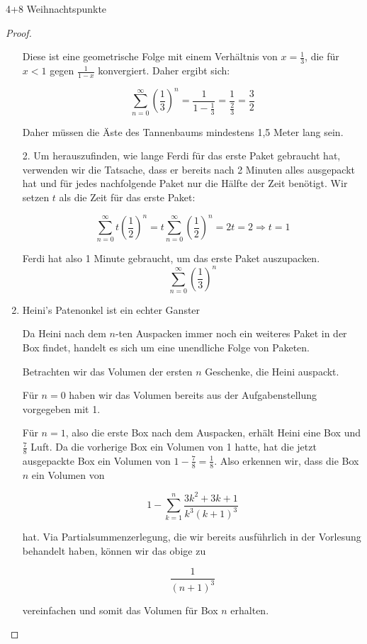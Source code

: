 \documentclass{../problemset}
\begin{document}
\begin{problem}[Weihnachtsaufgaben*]{4+8 Weihnachtspunkte}
\begin{proof}
\begin{enumerate}
		      Diese ist eine geometrische Folge mit einem Verhältnis von \(x = \frac{1}{3}\),
		      die für \(x < 1\) gegen \(\frac{1}{1 - x}\) konvergiert. Daher ergibt sich:

		      \[
			      \sum_{n=0}^{\infty} {\left(\frac{1}{3}\right)}^n = \frac{1}{1 - \frac{1}{3}} = \frac{1}{\frac{2}{3}} = \frac{3}{2}
		      \]

		      Daher müssen die Äste des Tannenbaums mindestens 1,5 Meter lang sein.

		      2. Um herauszufinden, wie lange Ferdi für das erste Paket gebraucht hat, verwenden wir die Tatsache, dass er bereits nach 2 Minuten alles ausgepackt hat und für jedes nachfolgende Paket nur die Hälfte der Zeit benötigt.
		      Wir setzen $t$ als die Zeit für das erste Paket:

		      \[
			      \sum_{n=0}^{\infty} t {\left(\frac{1}{2}\right)}^n = t \sum_{n=0}^{\infty} {\left(\frac{1}{2}\right)}^n = 2t = 2 \Rightarrow t = 1
		      \]

		      Ferdi hat also 1 Minute gebraucht, um das erste Paket auszupacken.
		      \[
			      \sum_{n=0}^{\infty} {\left(\frac{1}{3}\right)}^n
		      \]

		\item Heini's Patenonkel ist ein echter Ganster

		      Da Heini nach dem $n$-ten Auspacken immer noch ein weiteres Paket in der Box
		      findet, handelt es sich um eine unendliche Folge von Paketen.

		      Betrachten wir das Volumen der ersten $n$ Geschenke, die Heini auspackt.

		      Für $n = 0$ haben wir das Volumen bereits aus der Aufgabenstellung vorgegeben
		      mit 1.

		      Für $n = 1$, also die erste Box nach dem Auspacken, erhält Heini eine Box und
		      $\frac{7}{8}$ Luft. Da die vorherige Box ein Volumen von 1 hatte, hat die jetzt
		      ausgepackte Box ein Volumen von $1 - \frac{7}{8} = \frac{1}{8}$. Also erkennen
		      wir, dass die Box $n$ ein Volumen von

		      \[
			      1 - \sum_{k=1}^n \frac{3k^2 + 3k + 1}{k^3{(k+1)}^3}
		      \]

		      hat. Via Partialsummenzerlegung, die wir bereits ausführlich in der Vorlesung
		      behandelt haben, können wir das obige zu

		      \[
			      \frac{1}{{(n+1)}^3}
		      \]

		      vereinfachen und somit das Volumen für Box $n$ erhalten.


\end{enumerate}
\end{proof}
\end{problem}
\end{document}
